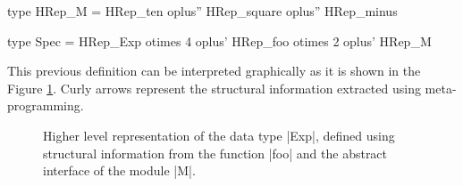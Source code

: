 



\begin{code}
type HRep_M  = HRep_ten oplus''  HRep_square oplus''  HRep_minus
\end{code}



\begin{code}
type Spec  =       HRep_Exp  otimes 4
           oplus'  HRep_foo  otimes 2
           oplus'  HRep_M
\end{code}

This previous definition can be interpreted graphically as it is shown in the
Figure \ref{fig:hrep}.
%
Curly arrows represent the structural information extracted using
meta-programming.

\begin{figure}[t]
  \centering
  
  \caption{Higher level representation of the data type |Exp|, defined using
    structural information from the function |foo| and the abstract interface of
    the module |M|.}
  \label{fig:hrep}
\end{figure}


